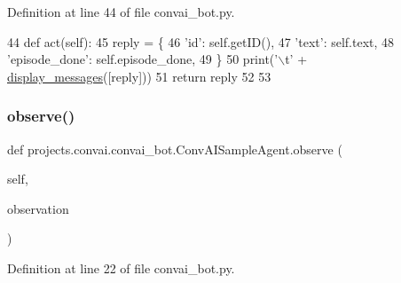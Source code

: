 Definition at line 44 of file convai\+\_\+bot.\+py.


\begin{DoxyCode}
44     \textcolor{keyword}{def }act(self):
45         reply = \{
46             \textcolor{stringliteral}{'id'}: self.getID(),
47             \textcolor{stringliteral}{'text'}: self.text,
48             \textcolor{stringliteral}{'episode\_done'}: self.episode\_done,
49         \}
50         print(\textcolor{stringliteral}{'\(\backslash\)t'} + \hyperlink{namespaceparlai_1_1utils_1_1misc_a7c86f996f4b55a960da46c1142a2c507}{display\_messages}([reply]))
51         \textcolor{keywordflow}{return} reply
52 
53 
\end{DoxyCode}
\mbox{\label{classprojects_1_1convai_1_1convai__bot_1_1ConvAISampleAgent_ae5914332a263728f39f20dbc3ad749b7}} 
\subsubsection{\texorpdfstring{observe()}{observe()}}
{\footnotesize\ttfamily def projects.\+convai.\+convai\+\_\+bot.\+Conv\+A\+I\+Sample\+Agent.\+observe (\begin{DoxyParamCaption}\item[{}]{self,  }\item[{}]{observation }\end{DoxyParamCaption})}



Definition at line 22 of file convai\+\_\+bot.\+py.


